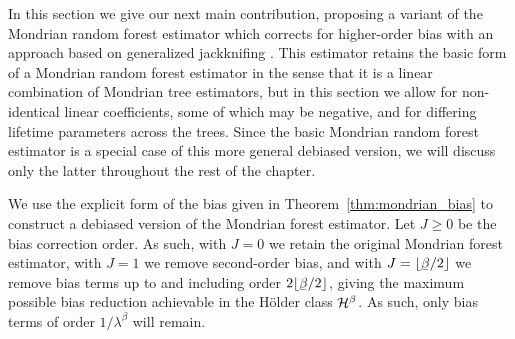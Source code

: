 In this section we give our next main contribution, proposing a variant of the
Mondrian random forest estimator which corrects for higher-order bias with an
approach based on generalized jackknifing \citep{schucany1977improvement}. This
estimator retains the basic form of a Mondrian random forest estimator in the
sense that it is a linear combination of Mondrian tree estimators, but in this
section we allow for non-identical linear coefficients, some of which may be
negative, and for differing lifetime parameters across the trees. Since the
basic Mondrian random forest estimator is a special case of this more general
debiased version, we will discuss only the latter throughout the rest of the
chapter.

We use the explicit form of the bias given in Theorem~\ref{thm:mondrian_bias} to
construct a debiased version of the Mondrian forest estimator. Let $J \geq 0$
be the bias correction order. As such, with $J=0$ we retain the original
Mondrian forest estimator, with $J=1$ we remove second-order bias, and with
$J = \lfloor\flbeta / 2 \rfloor$ we remove bias terms up to and including order
$2 \lfloor\flbeta / 2 \rfloor$, giving the maximum possible bias reduction
achievable in the H{\"o}lder class $\mathcal{H}^\beta$. As such, only bias terms of
order $1/\lambda^\beta$ will remain.

